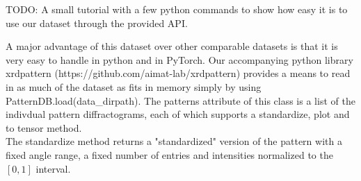 TODO: A small tutorial with a few python commands to show how easy it is to use our dataset through the provided API.

A major advantage of this dataset over other comparable datasets is that it is very easy to handle in python and in PyTorch.
Our accompanying python library xrdpattern (https://github.com/aimat-lab/xrdpattern) provides a means to read in as much of the dataset as fits in memory simply by using PatternDB.load(data\_dirpath). The patterns attribute of this class is a list of the indivdual pattern diffractograms, each of which supports a standardize, plot and to tensor method. \\
The standardize method returns a "standardized" version of the pattern with a fixed angle range, a fixed number of entries and intensities normalized to the $[0,1]$ interval.